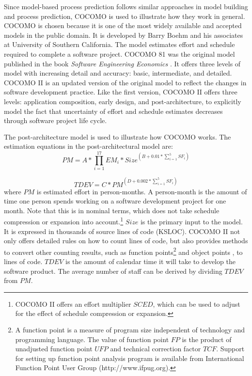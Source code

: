 Since model-based process prediction follows similar approaches in model building and process prediction, COCOMO is used to illustrate how they work in general. COCOMO is chosen because it is one of the most widely available and accepted models in the public domain.
It is developed by Barry Boehm and his associates at University of Southern California.  The model estimates effort and schedule required to complete a software project. COCOMO 81 was the original model published in the book \textit{Software Engineering Economics} \cite{Cocomo:1981}. It offers three levels of model with increasing detail and accuracy: basic, intermediate, and detailed. COCOMO II \cite{Cocomo:2000} is an updated version of the original model to reflect the changes in software development practice. Like the first version, COCOMO II offers three levels: application composition, early design, and post-architecture, to explicitly model the fact that uncertainty of effort and schedule estimates decreases through software project life cycle. 

The post-architecture model is used to illustrate how COCOMO works. The estimation equations in the post-architectural model are:
  \begin{equation}
    PM = A * \prod_{i=1}^{17}EM_{i} * Size ^{(B + 0.01 * \sum_{i=1}^{5}SF_{i})}
  \end{equation}

  \begin{equation}
    TDEV = C * PM ^{(D + 0.002 * \sum_{i=1}^{5}SF_{i})}
  \end{equation}
where $PM$ is estimated effort in person-months. A person-month is the amount of time one person spends working on a software development project for one month. Note that this is in nominal terms, which does not take schedule compression or expansion into account.\footnote{COCOMO II offers an effort multiplier $SCED$, which can be used to adjust for the effect of schedule compression or expansion.} $Size$ is the primary input to the model. It is expressed in thousands of source lines of code (KSLOC). COCOMO II not only offers detailed rules on how to count lines of code, but also provides methods to convert other counting results, such as function points\footnote{A function point is a measure of program size independent of technology and programming language. The value of function point $FP$ is the product of unadjusted function point $UFP$ and technical correction factor $TCF$. Support for setting up function point analysis program is available from International Function Point User Group (http://www.ifpug.org).} \cite{Albrecht:1983} and object points \cite{Banker:1991, Banker:1994}, to lines of code. $TDEV$ is the amount of calendar time it will take to develop the software product. The average number of staff can be derived by dividing $TDEV$ from $PM$.

